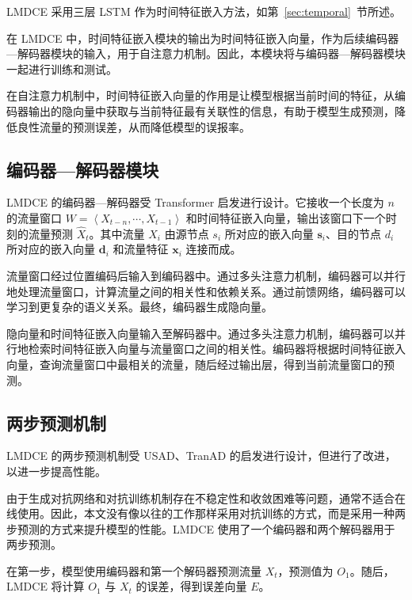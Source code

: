 {LMDCE 采用三层 LSTM 作为时间特征嵌入方法，如第~\ref{sec:temporal}~节所述。

在 LMDCE 中，时间特征嵌入模块的输出为时间特征嵌入向量，作为后续编码器—解码器模块的输入，用于自注意力机制。因此，本模块将与编码器—解码器模块一起进行训练和测试。

在自注意力机制中，时间特征嵌入向量的作用是让模型根据当前时间的特征，从编码器输出的隐向量中获取与当前特征最有关联性的信息，有助于模型生成预测，降低良性流量的预测误差，从而降低模型的误报率。

\subsection{编码器—解码器模块}

LMDCE 的编码器—解码器受 Transformer\citep{vaswani2017attention} 启发进行设计。它接收一个长度为 $n$ 的流量窗口 $W=\left<X_{t-n},\cdots,X_{t-1}\right>$ 和时间特征嵌入向量，输出该窗口下一个时刻的流量预测 $\hat{X}_t$。其中流量 $X_i$ 由源节点 $s_i$ 所对应的嵌入向量 $\mathbf{s}_i$、目的节点 $d_i$ 所对应的嵌入向量 $\mathbf{d}_i$ 和流量特征 $\mathbf{x}_i$ 连接而成。

流量窗口经过位置编码后输入到编码器中。通过多头注意力机制，编码器可以并行地处理流量窗口，计算流量之间的相关性和依赖关系\citep{vaswani2017attention}。通过前馈网络，编码器可以学习到更复杂的语义关系。最终，编码器生成隐向量。

隐向量和时间特征嵌入向量输入至解码器中。通过多头注意力机制，编码器可以并行地检索时间特征嵌入向量与流量窗口之间的相关性。编码器将根据时间特征嵌入向量，查询流量窗口中最相关的流量，随后经过输出层，得到当前流量窗口的预测。

\subsection{两步预测机制}

LMDCE 的两步预测机制受 USAD\citep{audibert2020usad}、TranAD\citep{tuli2022tranad} 的启发进行设计，但进行了改进，以进一步提高性能。

由于生成对抗网络和对抗训练机制存在不稳定性和收敛困难等问题\citep{darban2022deep,kodali2017convergence}，通常不适合在线使用。因此，本文没有像以往的工作\citep{audibert2020usad, tuli2022tranad, li2019mad}那样采用对抗训练的方式，而是采用一种两步预测的方式来提升模型的性能。LMDCE 使用了一个编码器和两个解码器用于两步预测。

在第一步，模型使用编码器和第一个解码器预测流量 $X_t$，预测值为 $O_1$。随后，LMDCE 将计算 $O_1$ 与 $X_t$ 的误差，得到误差向量 $E$。

}
